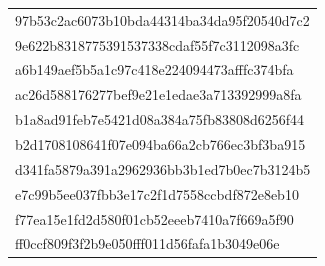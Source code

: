 \begin{tabular}{l}
97b53c2ac6073b10bda44314ba34da95f20540d7c2 \\
9e622b8318775391537338cdaf55f7c3112098a3fc \\
a6b149aef5b5a1c97c418e224094473afffc374bfa \\
ac26d588176277bef9e21e1edae3a713392999a8fa \\
b1a8ad91feb7e5421d08a384a75fb83808d6256f44 \\
b2d1708108641f07e094ba66a2cb766ec3bf3ba915 \\
d341fa5879a391a2962936bb3b1ed7b0ec7b3124b5 \\
e7c99b5ee037fbb3e17c2f1d7558ccbdf872e8eb10 \\
f77ea15e1fd2d580f01cb52eeeb7410a7f669a5f90 \\
ff0ccf809f3f2b9e050fff011d56fafa1b3049e06e \\
\bottomrule
\end{tabular}
